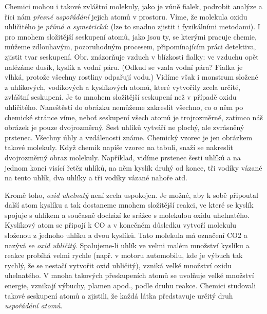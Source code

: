 \documentclass[
  paper=157.794mm:210.392mm,
  DIV=36,
  headinclude=false
]{scrbook}
\begin{document}
  
  Chemici mohou i takové zvláštní molekuly, jako je vůně fialek, podrobit analýze a říci nám
  \emph{přesné uspořádání} jejich atomů v prostoru. Víme, že molekula oxidu uhličitého je
  \emph{přímá a symetrická}: (lze to snadno zjistit i fyzikálními metodami). I pro mnohem složitější
  seskupení atomů, jako jsou ty, se kterými pracuje chemie, můžeme zdlouhavým, pozoruhodným
  procesem, připomínajícím práci detektiva, zjistit tvar seskupení. Obr. znázorňuje vzduch v
  blízkosti fialky: ve vzduchu opět nalézáme dusík, kyslík a vodní páru. (Odkud se vzala vodní pára?
  Fialka je vlhká, protože všechny rostliny odpařují vodu.) Vidíme však i monstrum složené z
  uhlíkových, vodíkových a kyslíkových atomů, které vytvořily zcela určité, zvláštní seskupení. Je
  to mnohem složitější seskupení než v případě oxidu uhličitého. Naneštěstí do obrázku nemůžeme
  zakreslit všechno, co o něm po chemické stránce víme, neboť seskupení všech atomů je trojrozměrné,
  zatímco náš obrázek je pouze dvojrozměrný. Šest uhlíků vytváří ne plochý, ale zvrásněný prstenec.
  Všechny úhly a vzdálenosti známe. Chemický vzorec je jen obrázkem takové molekuly. Když chemik
  napíše vzorec na tabuli, snaží se nakreslit dvojrozměrný obraz molekuly. Například, vidíme
  prstenec šesti uhlíků a na jednom konci visící řetěz uhlíků, na něm kyslík druhý od konce, tři
  vodíky vázané na tento uhlík, dva uhlíky a tři vodíky vázané nahoře atd.

  Kromě toho, \emph{oxid uhelnatý} není zcela uspokojen. Je možné, aby k sobě připoutal další atom
  kyslíku a tak dostaneme mnohem složitější reakci, ve které se kyslík spojuje s uhlíkem a současně
  dochází ke srážce s molekulou oxidu uhelnatého. Kyslíkový atom se připojí k CO a v konečném
  důsledku vytvoří molekulu složenou z jednoho uhlíku a dvou kyslíků. Tato molekula má označení CO2
  a nazývá se \emph{oxid uhličitý}. Spalujeme-li uhlík ve velmi malém množství kyslíku a reakce
  probíhá velmi rychle (např. v motoru automobilu, kde je výbuch tak rychlý, že se nestačí vytvořit
  oxid uhličitý), vzniká velké množství oxidu uhelnatého. V mnoha takových přeskupeních atomů se
  uvolňuje velké množství energie, vznikají výbuchy, plamen apod., podle druhu reakce. Chemici
  studovali takové seskupení atomů a zjistili, že každá látka představuje určitý druh
  \emph{uspořádání atomů}.
\end{document}
